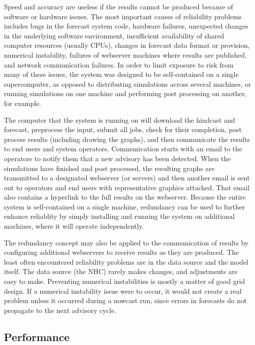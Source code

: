 \documentclass[12pt]{article}
\begin{document}
Speed and accuracy are useless if the results cannot be produced 
because of software or hardware issues. The most important causes of 
reliability problems includes bugs in the forecast system code, 
hardware failures, unexpected changes in the underlying software 
environment, insufficient availability of shared computer resources 
(usually CPUs), changes in forecast data format or provision, 
numerical instability, failures of webserver machines where results 
are published, and network communication failures. In order to limit 
exposure to risk from many of these issues, the system was designed 
to be self-contained on a single supercomputer, as opposed to 
distributing simulations across several machines, or running 
simulations on one machine and performing post processing on 
another, for example. 

The computer that the system is running on will download the 
hindcast and forecast, preprocess the input, submit all jobs, check 
for their completion, post process results (including drawing the 
graphs), and then communicate the results to end users and system 
operators. Communication starts with an email to the operators to 
notify them that a new advisory has been detected. When the 
simulations have finished and post processed, the resulting graphs 
are transmitted to a designated webserver (or servers) and then 
another email is sent out to operators and end users with 
representative graphics attached. That email also contains a 
hyperlink to the full results on the webserver. Because the entire 
system is self-contained on a single machine, redundancy can be used 
to further enhance reliablity by simply installing and running the 
system on additional machines, where it will operate independently. 

The redundancy concept may also be applied to the communication of 
results by configuring additional webservers to receive results as 
they are produced. The least often encountered reliability problems 
are in the data source and the model itself. The data source (the 
NHC) rarely makes changes, and adjustments are easy to make. 
Preventing numerical instabilities is mostly a matter of good grid 
design. If a numerical instability issue were to occur, it would not 
create a real problem unless it occurred during a nowcast run, since 
errors in forecasts do not propagate to the next advisory cycle.

\subsection{Performance}
\end{document}
